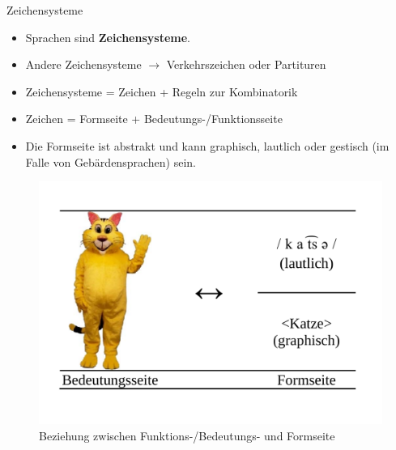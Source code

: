 \begin{frame}{Zeichensysteme}
			
\begin{itemize}
	\item<1-> Sprachen sind \textbf{Zeichensysteme}.
	\item<1-> Andere Zeichensysteme $\rightarrow$ Verkehrszeichen oder Partituren
	\item<2-> Zeichensysteme = Zeichen + Regeln zur Kombinatorik
	\item<3-> Zeichen = Formseite + Bedeutungs-/Funktionsseite
	\item<3-> Die Formseite ist abstrakt und kann graphisch, lautlich oder gestisch (im Falle von Gebärdensprachen) sein.
\end{itemize}			
			
\begin{figure}[H]
\centering
				
\includegraphics[scale=0.15]{material/01SSZeichenKatze}
\caption{Beziehung zwischen Funktions-/Bedeutungs- und Formseite}
\label{Zeichen1}
\end{figure}

\end{frame}			



